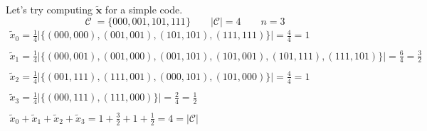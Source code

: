 \begin{example}
    Let's try computing $\mathbf{\tilde{x}}$ for a simple code.
    \begin{equation*}
        \mathcal{C} \; = \{000, 001, 101, 111\} \quad\quad |\mathcal{C}|=4 \quad\quad n=3
    \end{equation*}
    \begin{equation*}
        \begin{array}{l}
            \tilde{x}_0 = \frac{1}{4}|\{(000,000), (001, 001), (101, 101), (111, 111)\}|=\frac{4}{4}=1 \\\\
            \tilde{x}_1 = \frac{1}{4}|\{(000,001), (001,000), (001,101), (101, 001), (101, 111), (111, 101)\}|=\frac{6}{4}=\frac{3}{2}\\\\
            \tilde{x}_2 = \frac{1}{4}|\{(001,111), (111, 001), (000,101), (101, 000)\}|=\frac{4}{4}=1\\\\
            \tilde{x}_3 = \frac{1}{4}|\{(000,111), (111, 000)\}|=\frac{2}{4}=\frac{1}{2}\\\\
            \tilde{x}_0 + \tilde{x}_1 + \tilde{x}_2 + \tilde{x}_3 = 1 + \frac{3}{2} + 1 + \frac{1}{2} = 4 = |\mathcal{C}|
        \end{array}
    \end{equation*}
\end{example}
